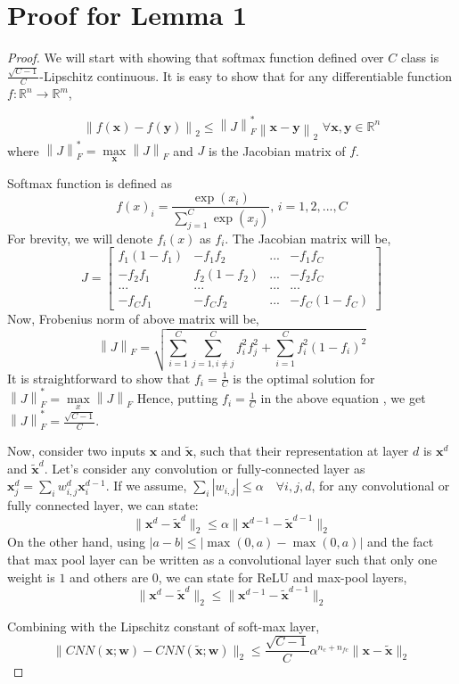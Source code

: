 \documentclass{article} %
\begin{document}
\section{Proof for Lemma 1}
\begin{proof}
We will start with showing that softmax function defined over $C$ class is $\frac{\sqrt{C-1}}{C}$-Lipschitz continuous. It is easy to show that for any differentiable function \mbox{$f:\mathbb{R}^n\rightarrow\mathbb{R}^m$},

\[
\left \| f(\mathbf{x})-f(\mathbf{y})\right \|_2 \leq \left \|J\right \|^*_F  \left\| \mathbf{x}-\mathbf{y}\right\|_2  \, \, \forall \mathbf{x},\mathbf{y}\in\mathbb{R}^n
\]
where $\left \|J\right \|^*_F = \max\limits_{\mathbf{x}} \left \|J\right \|_F$ and $J$ is the Jacobian matrix of $f$.

Softmax function is defined as
\[
f(x)_i = \frac{\exp(x_i)}{\sum\limits_{j=1}^{C}\exp(x_j)}, \, i={1,2,...,C}
\]
For brevity, we will denote $f_i(x)$ as $f_i$. The Jacobian matrix will be,
\[
J = \begin{bmatrix} f_1(1-f_1) & -f_1f_2  & ... & -f_1f_C \\
-f_2f_1 & f_2(1-f_2)  & ...  & -f_2f_C \\
... & ... & ... & ...  \\
-f_{C}f_{1} & -f_{C}f_{2}  & ...  & -f_{C}(1-f_{C})
\end{bmatrix}
\]
Now, Frobenius norm of above matrix will be,
\[
\left \| J \right \|_F = \sqrt{\sum\limits_{i=1}^{C}\sum\limits_{j=1, i\neq j}^{C}f_{i}^{2}f_{j}^{2} + \sum\limits_{i=1}^{C} f_i^2(1-f_i)^2}
\]
It is straightforward to show that $f_i = \frac{1}{C}$ is the optimal solution for $\left \| J \right \|^{*}_F = \max\limits_{x}\left \| J \right \|_F $ Hence, putting $f_i = \frac{1}{C}$ in the above equation , we get \mbox{$\left \| J \right \|^{*}_F = \frac{\sqrt{C-1}}{C}$}.

Now, consider two inputs $\mathbf{x}$ and $\mathbf{\tilde{x}}$, such that their representation at layer $d$ is $\mathbf{x}^d$ and $\mathbf{\tilde{x}}^d$. Let's consider any convolution or fully-connected layer as $\mathbf{x}^d_j = \sum_i w_{i,j}^d \mathbf{x}^{d-1}_i$. If we assume, \mbox{$\sum_i |w_{i,j}| \leq \alpha \quad \forall i,j,d$}, for any convolutional or fully connected layer, we can state:
\[
\|\mathbf{x}^d - \mathbf{\tilde{x}}^d\|_2 \leq  \alpha \|\mathbf{x}^{d-1} - \mathbf{\tilde{x}}^{d-1}\|_2
\] 
On the other hand, using $|a-b| \leq |\max(0, a) - \max(0,a)|$ and the fact that max pool layer can be written as a convolutional layer such that only one weight is $1$ and others are $0$, we can state for ReLU and max-pool layers,
\[
\|\mathbf{x}^d - \mathbf{\tilde{x}}^d\|_2 \leq  \|\mathbf{x}^{d-1} - \mathbf{\tilde{x}}^{d-1}\|_2
\] 

Combining with the Lipschitz constant of soft-max layer,
\[
\|CNN(\mathbf{x};\mathbf{w}) - CNN(\mathbf{\tilde{x}};\mathbf{w})\|_2 \leq   \frac{\sqrt{C-1}}{C} \alpha^{n_c+n_{fc}}  \|\mathbf{x}-\mathbf{\tilde{x}}\|_2
\]
\end{proof}
\end{document}
